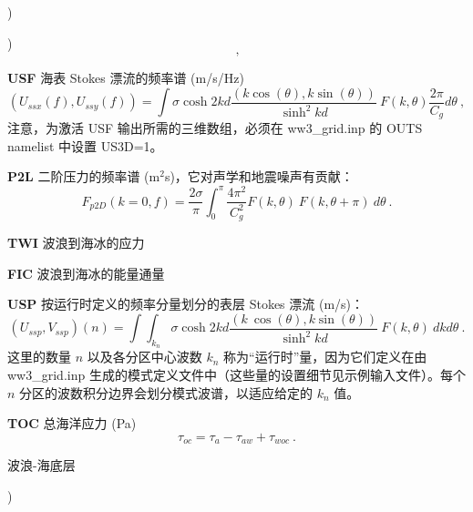 \begin{list}{)\hfill}
\begin{list}{)\hfill}
\begin{equation}
      \: , \label{eq:sop} \end{equation}
\item \textbf{USF} 海表 Stokes 漂流的频率谱 (m/s/Hz)
     \begin{equation} (U_{ssx}(f),U_{ssy}(f)) =  \int \sigma \cosh 2kd \frac{(k \cos(\theta),k \sin(\theta))}
        {\sinh^2 kd}  \: F(k,\theta) \frac{2 \pi}{C_g} d\theta
      \: , \label{eq:Ussf} \end{equation}
注意，为激活 USF 输出所需的三维数组，必须在 ww3\_grid.inp 的 OUTS namelist 中设置 US3D=1。
\item \textbf{P2L} 二阶压力的频率谱 (m$^2$s)，它对声学和地震噪声有贡献：
      \begin{equation} F_{p2D}(k=0,f) =  \frac{2 \sigma}{\pi} \int_0^{\pi}  \frac{4 \pi^2}{C_g^2} F(k,\theta) \:  F(k,\theta+\pi) \:  d\theta
      \: . \label{eq:sopf} \end{equation}
\item \textbf{TWI} 波浪到海冰的应力
\item \textbf{FIC} 波浪到海冰的能量通量
\item \textbf{USP} 按运行时定义的频率分量划分的表层 Stokes 漂流 (m/s)：
      \begin{equation} (U_{ssp},V_{ssp})(n) =  \int \!\!\!\! \int_{k_n}  \sigma \cosh 2kd \frac{(k\
      \cos(\theta),k \sin(\theta))}
        {\sinh^2 kd}  \: F(k,\theta) \: dk d\theta
      \: . \label{eq:Ussp} \end{equation}
这里的数量 $n$ 以及各分区中心波数 $k_n$ 称为“运行时”量，因为它们定义在由 ww3\_grid.inp 生成的模式定义文件中（这些量的设置细节见示例输入文件）。每个 $n$ 分区的波数积分边界会划分模式波谱，以适应给定的 $k_n$ 值。
\item \textbf{TOC} 总海洋应力 (Pa)
      \begin{equation} \tau_{oc} = \tau_a - \tau_{aw} + \tau_{woc}
      \: . \label{eq:Toc} \end{equation}
\end{list}

\item{波浪-海底层}

\begin{list}{)\hfill}
            { \leftmargin 8mm 
             \rightmargin 0mm \itemsep 0mm \parsep 0mm}


\end{list}
\end{list}
